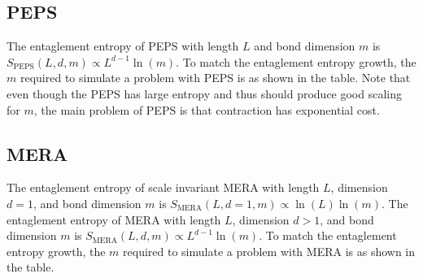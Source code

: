 \documentclass[showpacs,preprintnumbers,prb]{revtex4}
\begin{document}
\subsection{PEPS}
The entaglement entropy of PEPS with length $L$ and bond dimension $m$
is $S_\text{PEPS}(L,d,m) \propto L^{d-1}\ln(m)$.
To match the entaglement entropy growth, the $m$ required to simulate a problem 
with PEPS is as shown in the table. Note that even though the PEPS has
large entropy and thus should produce good scaling for $m$, the main problem of
PEPS is that contraction has exponential cost.

\subsection{MERA}
The entaglement entropy of scale invariant 
MERA with length $L$, dimension $d=1$, and bond dimension $m$
is $S_\text{MERA}(L,d=1,m) \propto \ln(L)\ln(m)$.
The entaglement entropy of MERA with length $L$, dimension $d>1$, and bond dimension $m$
is $S_\text{MERA}(L,d,m) \propto L^{d-1}\ln(m)$.
To match the entaglement entropy growth, the $m$ required to simulate a problem 
with MERA is as shown in the table.
\end{document}
